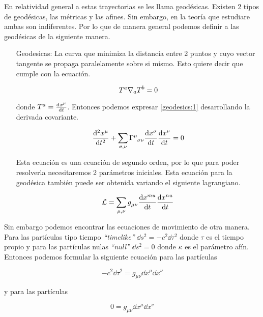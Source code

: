 \documentclass[../Main.tex]{subfiles}
\begin{document}
En relatividad general a estas trayectorias se les llama geodésicas. Existen 2 tipos de geodésicas, las métricas y las afines. Sin embargo, en la teoría que estudiare ambas son indiferentes. Por lo que de manera general podemos definir a las geodésicas de la siguiente manera.
\begin{itemize}
    \item[Geodesicas:]   La curva que minimiza la distancia entre 2 puntos y cuyo vector tangente se propaga paralelamente sobre si mismo. Esto quiere decir que cumple con la ecuación.
    
    \begin{equation}
        \tensor{T}{^{a}}\nabla_{a}{\tensor{T}{^{b}}} = 0
        \label{geodesics:1}
    \end{equation} 

    donde $\tensor{T}{^a} = \dv{x^{\mu}}{t}$. Entonces podemos expresar \eqref{geodesics:1} desarrollando la derivada covariante.

    \begin{equation}
        \dv[2]{x^{\mu}}{t} + \sum_{\sigma, \nu}\tensor{\Gamma}{^{\mu}_{\sigma \nu}}\dv{x^{\sigma}}{t}\dv{x^{\nu}}{t} = 0
    \end{equation}

    Esta ecuación es una ecuación de segundo orden, por lo que para poder resolverla necesitaremos 2 parámetros iniciales. Esta ecuación para la geodésica también puede ser obtenida variando el siguiente lagrangiano.

    \begin{equation}
        \mathcal{L} = \sum_{\mu,\nu}\tensor{g}{_{\mu\nu}}\dv{x^{mu}}{t}\dv{x^{nu}}{t}
    \end{equation}  
\end{itemize}

Sin embargo podemos encontrar las ecuaciones de movimiento de otra manera. Para las partículas tipo tiempo \textit{``timelike''} $\dd{s}^{2} = -c^{2}\dd{\tau}^{2}$ donde $\tau$ es el tiempo propio y para las partículas nulas \textit{``null''} $\dd{s}^{2} = 0$ donde $\kappa$ es el parámetro afín. Entonces podemos formular la siguiente ecuación para las partículas \tl

\begin{equation}
    -c^{2}\dd{\tau}^{2} = g_{\mu\nu} \dd{x}^{\mu}\dd{x}^{\nu}
    \label{timelikegeodesics}
\end{equation}

y para las partículas \nl

\begin{equation}
    0 = g_{\mu\nu} \dd{x}^{\mu}\dd{x}^{\nu}
    \label{nullgeodesics}
\end{equation}
\end{document}
